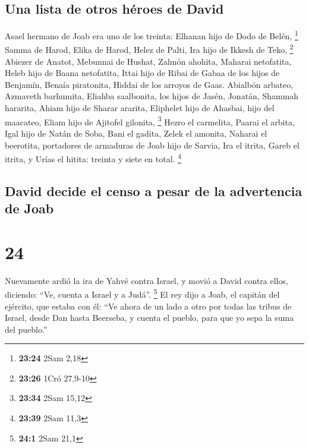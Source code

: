 \hypertarget{una-lista-de-otros-huxe9roes-de-david}{%
\subsection{Una lista de otros héroes de
David}\label{una-lista-de-otros-huxe9roes-de-david}}

 Asael hermano de Joab era uno de los treinta: Elhanan
hijo de Dodo de Belén, \footnote{\textbf{23:24} 2Sam 2,18}
 Samma de Harod, Elika de Harod,  Helez de
Palti, Ira hijo de Ikkesh de Teko, \footnote{\textbf{23:26} 1Cró 27,9-10}
 Abiezer de Anatot, Mebunnai de Hushat, 
Zalmón ahohita, Maharai netofatita,  Heleb hijo de Baana
netofatita, Ittai hijo de Ribai de Gabaa de los hijos de Benjamín,
 Benaía piratonita, Hiddai de los arroyos de Gaas.
 Abialbón arbateo, Azmaveth barhumita, 
Eliahba saalbonita, los hijos de Jasén, Jonatán,  Shammah
hararita, Ahiam hijo de Sharar ararita,  Eliphelet hijo
de Ahasbai, hijo del maacateo, Eliam hijo de Ajitofel gilonita,
\footnote{\textbf{23:34} 2Sam 15,12}  Hezro el carmelita,
Paarai el arbita,  Igal hijo de Natán de Soba, Bani el
gadita,  Zelek el amonita, Naharai el beerotita,
portadores de armaduras de Joab hijo de Sarvia,  Ira el
itrita, Gareb el itrita,  y Urías el hitita: treinta y
siete en total. \footnote{\textbf{23:39} 2Sam 11,3}

\hypertarget{david-decide-el-censo-a-pesar-de-la-advertencia-de-joab}{%
\subsection{David decide el censo a pesar de la advertencia de
Joab}\label{david-decide-el-censo-a-pesar-de-la-advertencia-de-joab}}

\hypertarget{section-23}{%
\section{24}\label{section-23}}

 Nuevamente ardió la ira de Yahvé contra Israel, y movió a
David contra ellos, diciendo: ``Ve, cuenta a Israel y a Judá''.
\footnote{\textbf{24:1} 2Sam 21,1}  El rey dijo a Joab, el
capitán del ejército, que estaba con él: ``Ve ahora de un lado a otro
por todas las tribus de Israel, desde Dan hasta Beerseba, y cuenta el
pueblo, para que yo sepa la suma del pueblo.''

